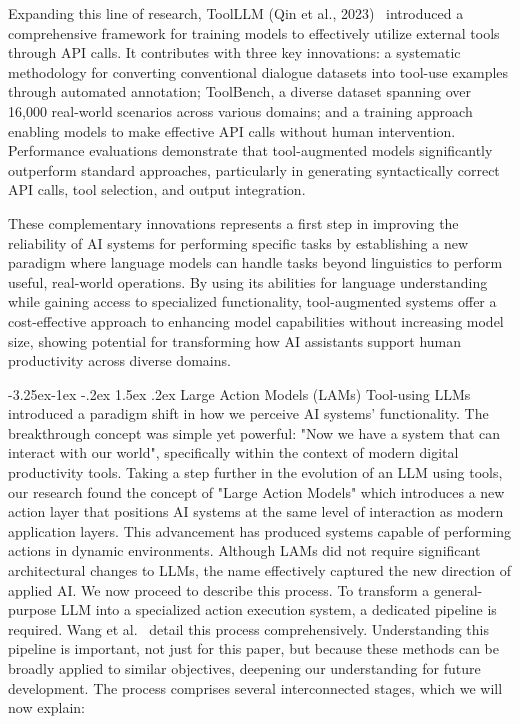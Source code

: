 \documentclass[journal,twoside,10pt]{IEEEtran}
\makeatletter
\renewcommand\subsection{\@startsection{subsection}{2}{\z@}%
                       {-3.25ex\@plus -1ex \@minus -.2ex}%
                       {1.5ex \@plus .2ex}%
                       {\normalfont\large\bfseries}}
\makeatother
\begin{document}
Expanding this line of research, ToolLLM (Qin et al., 2023)~\cite{qin2023toolllm} introduced a comprehensive framework for training models to effectively utilize external tools through API calls. It contributes with three key innovations: a systematic methodology for converting conventional dialogue datasets into tool-use examples through automated annotation; ToolBench, a diverse dataset spanning over 16,000 real-world scenarios across various domains; and a training approach enabling models to make effective API calls without human intervention. Performance evaluations demonstrate that tool-augmented models significantly outperform standard approaches, particularly in generating syntactically correct API calls, tool selection, and output integration.

These complementary innovations represents a first step in improving the reliability of AI systems for performing specific tasks by establishing a new paradigm where language models can handle tasks beyond linguistics to perform useful, real-world operations. By using its abilities for language understanding while gaining access to specialized functionality, tool-augmented systems offer a cost-effective approach to enhancing model capabilities without increasing model size, showing potential for transforming how AI assistants support human productivity across diverse domains.

\subsection{Large Action Models (LAMs)}
Tool-using LLMs introduced a paradigm shift in how we perceive AI systems' functionality. The breakthrough concept was simple yet powerful: "Now we have a system that can interact with our world", specifically within the context of modern digital productivity tools. Taking a step further in the evolution of  an LLM using tools, our research found the concept of "Large Action Models" which introduces a new action layer that positions AI systems at the same level of interaction as modern application layers. This advancement has produced systems capable of performing actions in dynamic environments. Although LAMs did not require significant architectural changes to LLMs, the name effectively captured the new direction of applied AI. We now proceed to describe this process.
To transform a general-purpose LLM into a specialized action execution system, a dedicated pipeline is required. Wang et al.~\cite{wang2025lam} detail this process comprehensively. Understanding this pipeline is important, not just for this paper, but because these methods can be broadly applied to similar objectives, deepening our understanding for future development. The process comprises several interconnected stages, which we will now explain:
\end{document}
